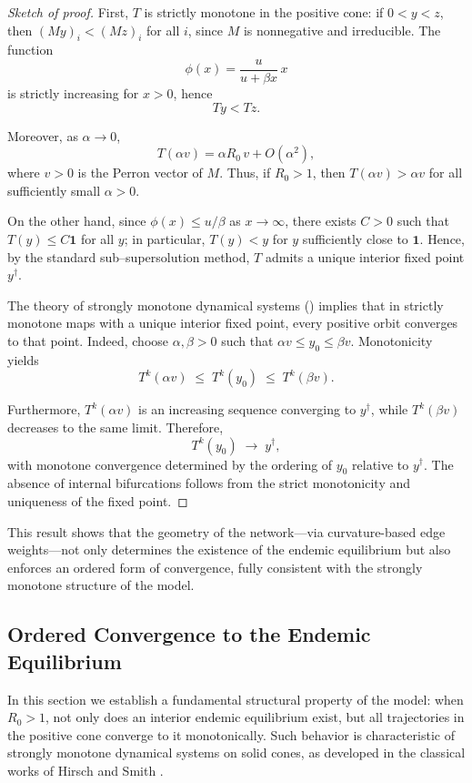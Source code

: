 \documentclass[final,3p,times,twocolumn]{elsarticle}
\begin{document}
\begin{proof}[Sketch of proof]
First, $T$ is strictly monotone in the positive cone: if $0<y<z$, then
$(My)_i < (Mz)_i$ for all $i$, since $M$ is nonnegative and irreducible.
The function
\[
\phi(x)=\frac{u}{u+\beta x}\,x
\]
is strictly increasing for $x>0$, hence
\[
Ty < Tz.
\]

Moreover, as $\alpha \to 0$,
\[
T(\alpha v)
= \alpha R_0\, v + O(\alpha^2),
\]
where $v>0$ is the Perron vector of $M$.  
Thus, if $R_0>1$, then $T(\alpha v)>\alpha v$ for all sufficiently small
$\alpha>0$.

On the other hand, since $\phi(x)\le u/\beta$ as $x\to\infty$, there exists
$C>0$ such that $T(y)\le C\mathbf{1}$ for all $y$; in particular,
$T(y)<y$ for $y$ sufficiently close to $\mathbf{1}$.  
Hence, by the standard sub–supersolution method, $T$ admits a unique interior
fixed point $y^\dagger$.

The theory of strongly monotone dynamical systems 
(\cite{Hirsch1985,Smith1995}) implies that in strictly monotone maps with a 
unique interior fixed point, every positive orbit converges to that point.
Indeed, choose $\alpha,\beta>0$ such that 
$\alpha v \le y_0 \le \beta v$.  
Monotonicity yields
\[
T^k(\alpha v) \;\le\; T^k(y_0) \;\le\; T^k(\beta v).
\]

Furthermore, $T^k(\alpha v)$ is an increasing sequence converging to $y^\dagger$,
while $T^k(\beta v)$ decreases to the same limit.  
Therefore,
\[
T^k(y_0) \;\longrightarrow\; y^\dagger,
\]
with monotone convergence determined by the ordering of $y_0$ relative to
$y^\dagger$.  
The absence of internal bifurcations follows from the strict monotonicity and
uniqueness of the fixed point.
\end{proof}

This result shows that the geometry of the network—via curvature-based edge
weights—not only determines the existence of the endemic equilibrium but also
enforces an ordered form of convergence, fully consistent with the strongly
monotone structure of the model.

\subsection{Ordered Convergence to the Endemic Equilibrium}

In this section we establish a fundamental structural property of the model:
when $R_0>1$, not only does an interior endemic equilibrium exist, but all
trajectories in the positive cone converge to it monotonically. Such behavior
is characteristic of strongly monotone dynamical systems on solid cones, as
developed in the classical works of Hirsch and Smith
\cite{Hirsch1985,Smith1995}.
\end{document}
